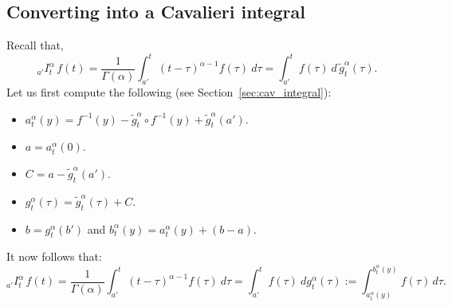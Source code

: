 \documentclass[twoside,reqno,11pt]{fcaa-var} %
\begin{document}
\subsection{Converting into a Cavalieri integral}
\label{sec:rl_to_cav}
Recall that,
\begin{equation}
_{a'}I_t^{\alpha}\,f(t) = \frac{1}{\Gamma(\alpha)}\int_{a'}^{t}(t-\tau)^{\alpha-1}f(\tau)~d\tau = \int_{a'}^{t} f(\tau)~d\,\widetilde{g}_t^{\alpha}(\tau). 
\end{equation}
Let us first compute the following (see Section~\ref{sec:cav_integral}):
\begin{itemize}
 \item $a_t^{\alpha}(y) = f^{-1}(y) - \widetilde{g}_t^{\alpha}\circ f^{-1}(y)+ \widetilde{g}_t^{\alpha}(a')$.
 \item $a = a_t^{\alpha}(0)$.
 \item $C = a - \widetilde{g}_t^{\alpha}(a')$.
 \item $g_t^{\alpha}(\tau) = \widetilde{g}_t^{\alpha}(\tau) + C$.
 \item $b = g_t^{\alpha}(b')$ and $b_t^{\alpha}(y) = a_t^{\alpha}(y) + (b-a)$.
\end{itemize}
It now follows that:
\begin{equation}
\label{eq:rl_to_c}
_{a'}I_t^{\alpha}\,f(t) =  \frac{1}{\Gamma(\alpha)}\int_{a'}^{t}(t-\tau)^{\alpha-1}f(\tau)~d\tau= \int_{a'}^{t} f(\tau)~dg_t^{\alpha}(\tau) := \int_{a_t^{\alpha}(y)}^{b_t^{\alpha}(y)} f(\tau)\,d\tau.
\end{equation}
\end{document}
